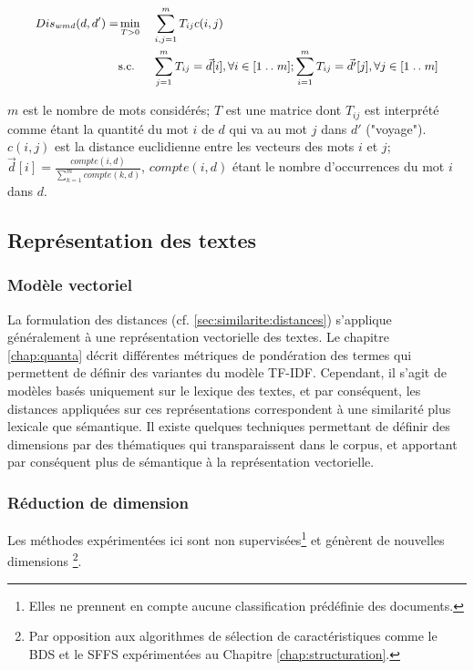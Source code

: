 \begin{itemize}
	\begin{equation*}\small
	\begin{aligned}
Dis_{wmd}(d, d') = 	& \mathop{\mathrm{min}}\limits\limits_{T>0}
	& & \sum\limits_{i,j=1}^m T_{ij} c(i,j) \\
	& \text{s.c.}
	& & \sum\limits_{j=1}^m T_{ij} = \vec{d}[i], \forall i \in [1\mathrel{{.}\,{.}}\nobreak m];  \sum\limits_{i=1}^m T_{ij} = \vec{d'}[j], \forall j \in [1\mathrel{{.}\,{.}}\nobreak m]
	\end{aligned}
	\end{equation*} 
	
	$m$ est le nombre de mots considérés; $T$ est une matrice dont $T_{ij}$ est interprété comme étant la quantité du mot $i$ de $d$ qui va au mot $j$ dans $d'$ ("voyage"). $c(i,j)$ est la distance euclidienne entre les vecteurs des mots $i$ et $j$; $\vec{d}[i] = \frac{compte(i, d)}{\sum\limits_{k=1}^m compte(k, d)}$, $compte(i, d)$ étant le nombre d'occurrences du mot $i$ dans $d$.
	
\end{itemize}

\subsection{Représentation des textes}
\label{sec:similarite:representation}
\subsubsection{Modèle vectoriel}
La formulation des distances (cf.  \ref{sec:similarite:distances}) s'applique généralement à une représentation vectorielle des textes. Le chapitre \ref{chap:quanta} décrit différentes métriques de pondération des termes qui permettent de définir des variantes du modèle TF-IDF. Cependant, il s'agit de modèles basés uniquement sur le lexique des textes, et par conséquent, les distances appliquées sur ces représentations  correspondent à une similarité plus lexicale que sémantique. Il existe quelques techniques permettant de définir des dimensions par des thématiques qui transparaissent dans le corpus, et apportant par conséquent plus de sémantique à la représentation vectorielle.

\subsubsection{Réduction de dimension}
\label{sec:similarite:reduction-dimension}
 Les méthodes expérimentées ici sont non supervisées\footnote{Elles ne prennent en compte aucune classification prédéfinie des documents.} et génèrent de nouvelles dimensions \footnote{Par opposition aux algorithmes de sélection de caractéristiques comme le BDS et le SFFS expérimentées au Chapitre \ref{chap:structuration}.}. %

